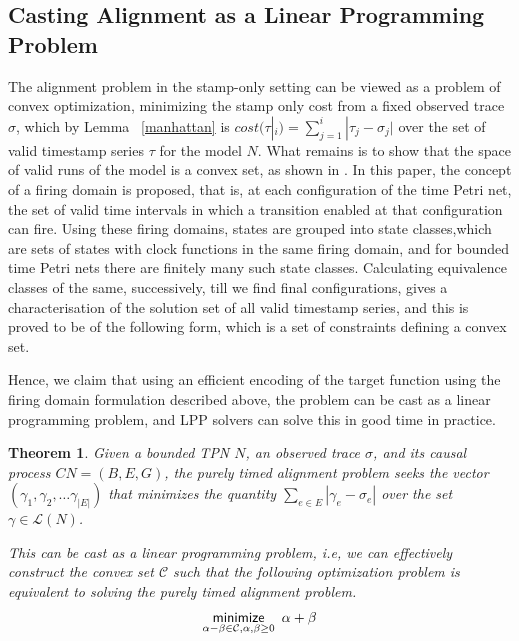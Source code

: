 \documentclass[conference]{IEEEtran}
\newtheorem{theorem}{Theorem}
\begin{document}
	\subsection{Casting Alignment as a Linear Programming Problem}\label{lpp}
	The alignment problem in the stamp-only setting can be viewed as a problem of convex optimization, minimizing the stamp only cost from a fixed observed trace $\sigma$, which by Lemma ~\ref{manhattan} is $cost(\tau|_i) = \sum_{j = 1}^{i} |\tau_j - \sigma_j|$ over the set of valid timestamp series $\tau$ for the model $N$. 
	What remains is to show that the space of valid runs of the model is a convex set, as shown in \cite{BM82}. 
	In this paper, the concept of a firing domain is proposed, that is, at each configuration of the time Petri net, the set of valid time intervals in which a transition enabled at that configuration can fire. 
	Using these firing domains, states are grouped into state classes,which are sets of states with clock functions in the same firing domain, and for bounded time Petri nets there are finitely many such state classes. 
	Calculating equivalence classes of the same, successively, till we find final configurations, gives a characterisation of the solution set of all valid timestamp series, and this is proved to be of the following form, which is a set of constraints defining a convex set. 
	
	Hence, we claim that using an efficient encoding of the target function using the firing domain formulation described above, the problem can be cast as a linear programming problem, and LPP solvers can solve this in good time in practice.  
	
	\begin{theorem}\label{convexset}
		Given a bounded TPN $N$, an observed trace $\sigma$, and its causal process $CN = (B, E, G)$, the purely timed alignment problem seeks the vector $(\gamma_1, \gamma_2, \dots \gamma_{|E|})$ that minimizes the quantity $\sum_{e \in E} |\gamma_e - \sigma_e|$ over the set $\gamma \in \mathcal{L}(N)$. 
		
		This can be cast as a linear programming problem, i.e, we can effectively construct the convex set $\mathcal{C}$ such that the following optimization problem is equivalent to solving the purely timed alignment problem. $$\underset{\alpha - \beta \in \mathcal{C}, \alpha, \beta \geq 0}{\mathsf{minimize}} \hspace{0.5em} \alpha + \beta  $$
		
	\end{theorem}
	
\end{document}

